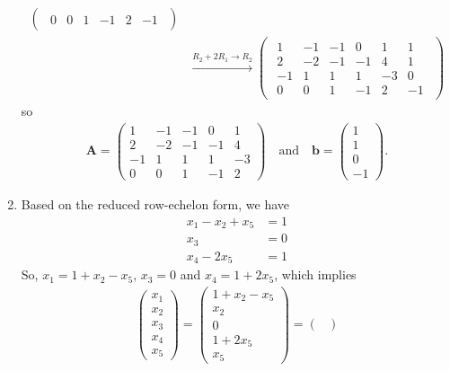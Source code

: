 \documentclass[12pt]{article}
\begin{document}
\begin{enumerate}[label=\textbf{(\alph*)}]
\begin{align*}
\begin{pmatrix}
\begin{array}{ccccc|c}
0 &  0 & 1 & -1 & 2 & -1
\end{array}
\end{pmatrix} \\
&\xrightarrow{R_2 + 2R_1 \to R_2} \begin{pmatrix}
\begin{array}{ccccc|c}
1 & -1 & -1 & 0 & 1 & 1 \\
2 & -2 & -1 & -1 & 4 & 1 \\
-1 & 1 & 1 & 1 & -3 & 0 \\
0 &  0 & 1 & -1 & 2 & -1
\end{array}
\end{pmatrix}
    \end{align*}
so \begin{align*}
    \mathbf{A}=\begin{pmatrix}
        1 & -1 & -1 & 0 & 1 \\
        2 & -2 & -1 & -1 & 4 \\
        -1 & 1 & 1 & 1 & -3 \\
        0 & 0 & 1 & -1 & 2
    \end{pmatrix}\quad\text{and}\quad \mathbf{b}=\begin{pmatrix}
        1 \\ 1 \\ 0 \\ -1
    \end{pmatrix}.
\end{align*}
\item Based on the reduced row-echelon form, we have \begin{align*}
    x_1-x_2+x_5&=1\\
    x_3&=0\\
    x_4-2x_5&=1
\end{align*}
So, $x_1=1+x_2-x_5$, $x_3=0$ and $x_4=1+2x_5$, which implies \begin{align*}
    \begin{pmatrix}
        x_1 \\ x_2 \\ x_3\\ x_4\\x_5
    \end{pmatrix}=\begin{pmatrix}
        1+x_2-x_5 \\ x_2 \\ 0 \\ 1+2x_5 \\ x_5
    \end{pmatrix}=\begin{pmatrix}

\end{pmatrix}
\end{align*}
\end{enumerate}
\end{document}
